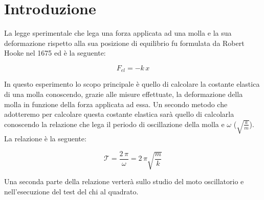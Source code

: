\section{Introduzione}
La legge sperimentale che lega una forza applicata ad una molla e la sua deformazione rispetto alla sua posizione di equilibrio fu formulata da Robert Hooke nel 1675 ed è la seguente:

\begin{equation}
	F_{el} = -k\,x
	\label{hooke}
\end{equation}

In questo esperimento lo scopo principale è quello di calcolare la costante elastica di una molla conoscendo, grazie alle misure effettuate, la deformazione della molla in funzione della forza applicata ad essa. Un secondo metodo che adotteremo per calcolare questa costante elastica sarà quello di calcolarla conoscendo la relazione che lega il periodo di oscillazione della molla e $\omega$ ($\sqrt{\frac{k}{m}}$). La relazione è la seguente:

\begin{equation}
	\mathcal{T} = \frac{2\,\pi}{\omega} = {2\,\pi}{\sqrt{\frac{m}{k}}}
\end{equation}

Una seconda parte della relazione verterà sullo studio del moto oscillatorio e nell'esecuzione del test del chi al quadrato.

